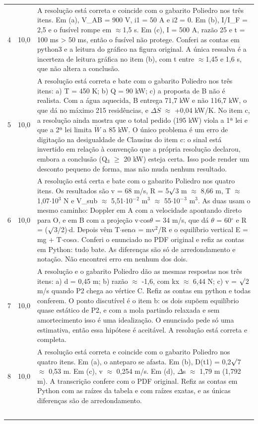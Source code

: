 \documentclass{article}%
\begin{document}
\begin{longtable}{@{}c c p{}@{}}
4 & 10,0 & A resolução está correta e coincide com o gabarito Poliedro nos três itens. Em (a), V\_AB = 900 V, i1 = 50 A e i2 = 0. Em (b), I/I\_F = 2,5 e o fusível rompe em $\approx$1,5 s. Em (c), I = 500 A, razão 25 e t = 100 ms > 50 ms, então o fusível não protege. Conferi as contas em python3 e a leitura do gráfico na figura original. A única ressalva é a incerteza de leitura gráfica no item (b), com t entre $\approx$1,45 e 1,6 s, que não altera a conclusão. \\
5 & 10,0 & A resolução está correta e bate com o gabarito Poliedro nos três itens: a) T = 450 K; b) Q = 90 kW; c) a proposta de B não é realista. Com a água aquecida, B entrega 71,7 kW e não 116,7 kW, o que dá no máximo 215 residências, e $\Delta$$\dot S$ $\approx$ +0,04 kW/K. No item c, a resolução ainda mostra que o total pedido (195 kW) viola a 1ª lei e que a 2ª lei limita $\dot W$ a 85 kW. O único problema é um erro de digitação na desigualdade de Clausius do item c: o sinal está invertido em relação à convenção que a própria resolução declarou, embora a conclusão (Q$_{3}$ $\geq$ 20 kW) esteja certa. Isso pode render um desconto pequeno de forma, mas não muda nenhum resultado. \\
6 & 10,0 & A resolução está certa e bate com o gabarito Poliedro nos quatro itens. Os resultados são v = 68 m/s, R = 5$\surd$3 m $\approx$ 8,66 m, T $\approx$ 1,07$\cdot$10$^3$ N e V\_sub $\approx$ 5,51$\cdot$10$^{-}$$^2$ m$^3$ $\approx$ 55$\cdot$10$^{-}$$^3$ m$^3$. As duas usam o mesmo caminho: Doppler em A com a velocidade apontando direto para O, e em B com a projeção v$\cdot$cos$\theta$ = 34 m/s, que dá $\theta$ = 60$^\circ$ e R = ($\surd$3/2)$\cdot$d. Depois vêm T$\cdot$sen$\alpha$ = mv$^2$/R e o equilíbrio vertical E = mg + T$\cdot$cos$\alpha$. Conferi o enunciado no PDF original e refiz as contas em Python: tudo bate. As diferenças são só de arredondamento e notação. Não encontrei erro em nenhum dos dois. \\
7 & 10,0 & A resolução e o gabarito Poliedro dão as mesmas respostas nos três itens: a) d = 0,45 m; b) razão $\approx$ -1,6, com kx $\approx$ 6,44 N; c) v = $\surd$2 m/s quando P2 chega ao vértice C. Refiz as contas em python e todas conferem. O ponto discutível é o item b: os dois supõem equilíbrio quase estático de P2, e com a mola partindo relaxada e sem amortecimento isso é uma idealização. O enunciado pede só uma estimativa, então essa hipótese é aceitável. A resolução está correta e completa. \\
8 & 10,0 & A resolução está correta e coincide com o gabarito Poliedro nos quatro itens. Em (a), o anteparo se afasta. Em (b), D(t1) = 0,2$\surd$7 $\approx$ 0,53 m. Em (c), v $\approx$ 0,254 m/s. Em (d), $\Delta$s $\approx$ 1,79 m (1,792 m). A transcrição confere com o PDF original. Refiz as contas em Python com as raízes da tabela e com raízes exatas, e as únicas diferenças são de arredondamento. \\
$$
\end{longtable}
\end{document}
